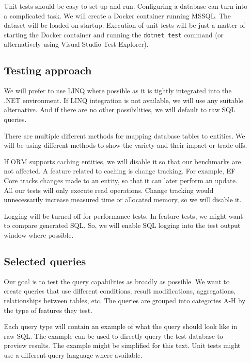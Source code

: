 Unit tests should be easy to set up and run. Configuring a database can turn into a complicated task. We will create a Docker container running MSSQL. The dataset will be loaded on startup. Execution of unit tests will be just a matter of starting the Docker container and running the \texttt{dotnet test} command (or alternatively using Visual Studio Test Explorer). 

\subsection{Testing approach}\label{sec:testing_approach}
We will prefer to use LINQ where possible as it is tightly integrated into the .NET environment. 
If LINQ integration is not available, we will use any suitable alternative. And if there are no other possibilities, we will default to raw SQL queries. 

There are multiple different methods for mapping database tables to entities. We will be using different methods to show the variety and their impact or trade-offs. 

If ORM supports caching entities, we will disable it so that our benchmarks are not affected. 
A feature related to caching is change tracking. For example, EF Core tracks changes made to an entity, so that it can later perform an update. All our tests will only execute read operations. Change tracking would unnecessarily increase measured time or allocated memory, so we will disable it.

Logging will be turned off for performance tests. In feature tests, we might want to compare generated SQL. So, we will enable SQL logging into the test output window where possible.


\subsection{Selected queries}\label{sec:selected_queries}
Our goal is to test the query capabilities as broadly as possible. We want to create queries that use different conditions, result modifications, aggregations, relationships between tables, etc. The queries are grouped into categories A-H by the type of features they test.

Each query type will contain an example of what the query should look like in raw SQL. The example can be used to directly query the test database to preview results. The example might be simplified for this text. Unit tests might use a different query language where available.

